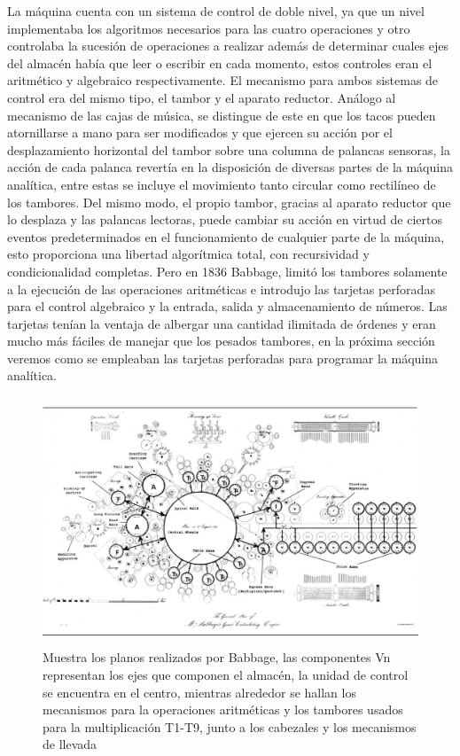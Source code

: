\documentclass[runningheads,a4paper]{llncs}
\begin{document}
La máquina cuenta con un sistema de control de doble nivel, ya que un nivel implementaba los algoritmos necesarios
para las cuatro operaciones y otro controlaba la sucesión de operaciones a realizar además de determinar cuales 
ejes del almacén había que leer o escribir en cada momento, estos controles eran el aritmético y algebraico 
respectivamente. El mecanismo para ambos sistemas de control era del mismo tipo, el tambor y el aparato reductor.
Análogo al mecanismo de las cajas de música, se distingue de este en que los tacos pueden atornillarse a mano para ser modificados y que ejercen su acción por el desplazamiento horizontal del tambor sobre una columna de palancas sensoras,
la acción de cada palanca revertía en la disposición de diversas partes de la máquina analítica, entre estas se incluye el movimiento tanto circular como rectilíneo de los tambores. Del mismo modo, el propio tambor, gracias al aparato reductor que lo desplaza y las palancas lectoras, puede cambiar su acción en virtud de ciertos eventos predeterminados en el funcionamiento de cualquier parte de la máquina, esto proporciona una libertad algorítmica total, con recursividad y condicionalidad completas. Pero en 1836 Babbage, limitó los tambores solamente a la ejecución de las operaciones aritméticas e introdujo las tarjetas perforadas para el control algebraico y la entrada, salida y almacenamiento de números. Las tarjetas tenían la ventaja de albergar una cantidad ilimitada de órdenes
y eran mucho más fáciles de manejar que los pesados tambores, en la próxima sección veremos como se empleaban las
tarjetas perforadas para programar la máquina analítica.

\begin{figure}
	\centering
	\includegraphics[height=7.4cm]{imgs/AMachine}
	\caption{Muestra los planos realizados por Babbage, las componentes Vn representan los ejes que componen el almacén, la unidad de control se encuentra en el centro, mientras alrededor se hallan los mecanismos para la operaciones aritméticas y los tambores usados para la multiplicación T1-T9, junto a los cabezales y los mecanismos de llevada}
	\label{fig:AM}
\end{figure}
\end{document}
